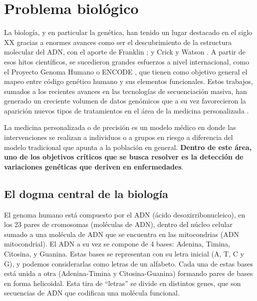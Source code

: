 \section{Problema biológico}

La biología, y en particular la genética, han tenido un lugar destacado en el siglo XX gracias a enormes avances como ser el descubrimiento de la estructura molecular del ADN, con el aporte de Franklin  \cite{FRANKLIN1953}; y Crick y Watson \cite{WATSON1953}. A partir de esos hitos científicos, se sucedieron grandes esfuerzos a nivel internacional, como el Proyecto Genoma Humano \cite{Consortium2001} o ENCODE \cite{Consortium2012}, que tienen como objetivo general el mapeo entre código genético humano y sus elementos funcionales. Estos trabajos, sumados a los recientes avances en las tecnologías de secuenciación masiva, han generado un creciente volumen de datos genómicos que a su vez favorecieron la aparición nuevos tipos de tratamientos en el área de la medicina personalizada \cite{doi:10.1056/NEJMp1006304}. 

La medicina personalizada o de precisión es un modelo médico en donde las intervenciones se realizan a individuos o a grupos en riesgo a diferencia del modelo tradicional que apunta a la población en general. \textbf{Dentro de este área, uno de los objetivos críticos que se busca resolver es la detección de variaciones genéticas que deriven en enfermedades}.

\subsection{El dogma central de la biología}

El genoma humano está compuesto por el ADN (ácido desoxirribonucleico), en los 23 pares de cromosomas (moléculas de ADN), dentro del núcleo celular sumado a una molécula de ADN que se encuentra en las mitocondrias (ADN mitocondrial). El ADN a su vez se compone de 4 bases: Adenina, Timina, Citosina, y Guanina. Estas bases se representan con su letra inicial (A, T, C y G), y podemos considerarlas como letras de un alfabeto. Cada una de estas bases está unida a otra (Adenina-Timina y Citosina-Guanina) formando pares de bases en forma helicoidal. Esta tira de ``letras'' se divide en distintos genes, que son secuencias de ADN que codifican una molécula funcional.

